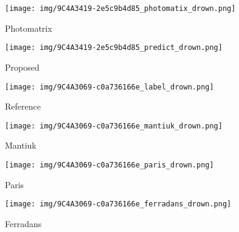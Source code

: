 \documentclass[journal]{IEEEtran}
\begin{document}
\begin{figure*}[tb]
\begin{subfigure}[b]{0.245\textwidth}
        \end{subfigure}
        \begin{subfigure}[b]{0.245\textwidth}   
            \centering 
            \texttt{[image: img/9C4A3419-2e5c9b4d85\_photomatix\_drown.png]}
            \caption[]%
            {{\small Photomatrix \cite{photomatrix} }}    
            \label{fig:mean and std of net34}
        \end{subfigure}
        \begin{subfigure}[b]{0.245\textwidth}   
            \centering 
            \texttt{[image: img/9C4A3419-2e5c9b4d85\_predict\_drown.png]}
            \caption[]%
            {{\small Proposed  }}    
            \label{fig:mean and std of net44}
        \end{subfigure}
         \centering
        \begin{subfigure}[b]{0.245\textwidth}  
            \centering 
            \texttt{[image: img/9C4A3069-c0a736166e\_label\_drown.png]}
            \caption[]%
            {{\small Reference }}    
            \label{fig:mean and std of net24}
        \end{subfigure}
        \begin{subfigure}[b]{0.245\textwidth}  
            \centering 
            \texttt{[image: img/9C4A3069-c0a736166e\_mantiuk\_drown.png]}
            \caption[]%
            {{\small Mantiuk \cite{mantiuk2008display} }}    
            \label{fig:mean and std of net24}
        \end{subfigure}
        \begin{subfigure}[b]{0.245\textwidth}   
            \centering 
            \texttt{[image: img/9C4A3069-c0a736166e\_paris\_drown.png]}
            \caption[]%
            {{\small Paris \cite{paris2015local} }}    
            \label{fig:mean and std of net34}
        \end{subfigure}
        \begin{subfigure}[b]{0.245\textwidth}   
            \centering 
            \texttt{[image: img/9C4A3069-c0a736166e\_ferradans\_drown.png]}
            \caption[]%
            {{\small Ferradans \cite{ferradans2011analysis}     }}    
            \label{fig:mean and std of net44}
        \end{subfigure}
        \label{fig:mean and std of nets}

\end{figure*}
\end{document}

